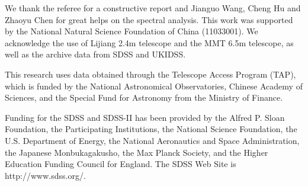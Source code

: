 \documentclass[referee]{raa}
\begin{document}
\normalem
\begin{acknowledgements}
We thank the referee for a constructive report and Jianguo Wang, Cheng Hu and Zhaoyu Chen for great helps on the spectral analysis.
This work was supported by the National
Natural Science Foundation of China  (11033001).
We acknowledge the use of Lijiang 2.4m telescope and  the MMT 6.5m telescope, as well as
the archive data from SDSS and UKIDSS.

This research uses data obtained through the Telescope Access Program (TAP), which is funded by the National Astronomical Observatories, Chinese Academy of Sciences, and the Special Fund for Astronomy from the Ministry of Finance.

 Funding for the SDSS and SDSS-II has been provided by the Alfred P. Sloan Foundation, the Participating Institutions, the National Science Foundation, the U.S. Department of Energy, the National Aeronautics and Space Administration, the Japanese Monbukagakusho, the Max Planck Society, and the Higher Education Funding Council for England. The SDSS Web Site is http://www.sdss.org/.

\end{acknowledgements}



\end{document}
